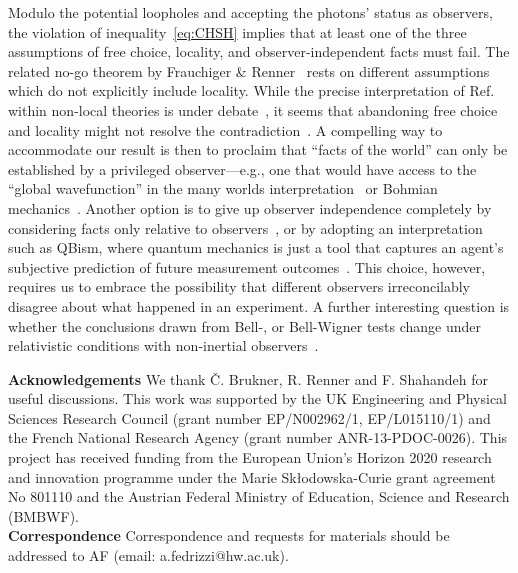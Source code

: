 \documentclass[aps,floatfix,superscriptaddress,twocolumn,tightenlines,amsmath,amssymb,nofootinbib,10pt]{revtex4-1}
\begin{document}
Modulo the potential loopholes and accepting the photons' status as observers, the violation of inequality~\eqref{eq:CHSH} implies that at least one of the three assumptions of free choice, locality, and observer-independent facts must fail. The related no-go theorem by Frauchiger \& Renner~\cite{Frauchiger2016} rests on different assumptions which do not explicitly include locality. While the precise interpretation of Ref.~\cite{Frauchiger2016} within non-local theories is under debate~\cite{Lazarovici2019}, it seems that
abandoning free choice and locality might not resolve the contradiction~\cite{Frauchiger2016}. A compelling way to accommodate our result is then to proclaim that ``facts of the world'' can only be established by a privileged observer---e.g., one that would have access to the ``global wavefunction'' in the many worlds interpretation~\cite{Everett1957} or Bohmian mechanics~\cite{Bohm1952}. Another option is to give up observer independence completely by considering facts only relative to observers~\cite{Rovelli1996}, or by adopting an interpretation such as QBism, where quantum mechanics is just a tool that captures an agent's subjective prediction of future measurement outcomes~\cite{Fuchs2017}. This choice, however, requires us to embrace the possibility that different observers irreconcilably disagree about what happened in an experiment. A further interesting question is whether the conclusions drawn from Bell-, or Bell-Wigner tests change under relativistic conditions with non-inertial observers~\cite{Durham2019}.






\bigskip

\textbf{Acknowledgements} 
We thank {\v C}. Brukner, R. Renner and F. Shahandeh for useful discussions. This work was supported by the UK Engineering and Physical Sciences Research Council (grant number EP/N002962/1, EP/L015110/1) and the French National Research Agency (grant number ANR-13-PDOC-0026). This project has received funding from the European Union's Horizon 2020 research and innovation programme under the Marie Sk\l{}odowska-Curie grant agreement No 801110 and the Austrian Federal Ministry of Education, Science and Research (BMBWF).\\

\textbf{Correspondence} Correspondence and requests for materials should be addressed to AF (email: a.fedrizzi@hw.ac.uk).\\

\newpage
\appendix
\clearpage
\renewcommand{\theequation}{S\arabic{equation}}
\renewcommand{\thefigure}{S\arabic{figure}}
\renewcommand{\thetable}{\Roman{table}}
\renewcommand{\thesection}{S\Roman{section}}
\setcounter{equation}{0}
\setcounter{figure}{0}
\end{document}
